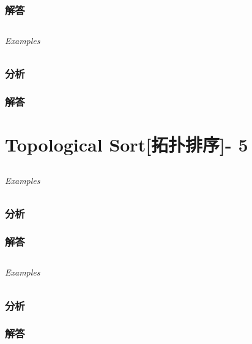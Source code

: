\documentclass[UTF8,a4paper,12pt]{ctexbook}
\begin{document}
	\subsection{解答}
	
\section{}
	
	\subparagraph{Examples}
	
	\subsection{分析}
	
	\subsection{解答}
\chapter{Topological Sort[拓扑排序]- 5}
\section{}
	
	\subparagraph{Examples}
	
	\subsection{分析}
	
	\subsection{解答}
	
\section{}
	
	\subparagraph{Examples}
	
	\subsection{分析}
	
	\subsection{解答}
	
\section{}
	
\end{document}
